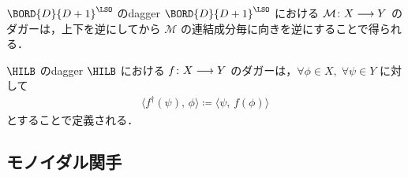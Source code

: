\documentclass[TQFT_main]{subfiles}
\begin{document}
\begin{myexample}[label=ex:Cob-dagger]{$\BORD{D}{D+1}^{\LSO}$ のdagger}
    $\BORD{D}{D+1}^{\LSO}$ における $\mathcal{M} \colon X \longrightarrow Y$ のダガーは，上下を逆にしてから $\mathcal{M}$ の連結成分毎に向きを逆にすることで得られる．
\end{myexample}


\begin{myexample}[label=ex:Hilb-dagger]{$\HILB$ のdagger}
    $\HILB$ における $f\colon X \longrightarrow Y$ のダガーは，$\forall \phi \in X,\; \forall \psi \in Y$ に対して
    \begin{align}
        \langle f^\dagger (\psi),\, \phi \rangle \coloneqq \langle \psi,\, f(\phi) \rangle
    \end{align}
    とすることで定義される．
\end{myexample}

\subsection{モノイダル関手}
\end{document}

